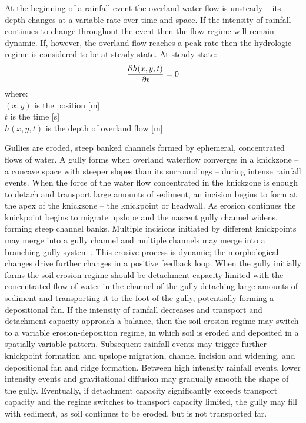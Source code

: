 \documentclass[gmd, manuscript]{copernicus}
\begin{document}
At the beginning of a rainfall event 
the overland water flow  is unsteady -- 
its depth changes at a variable rate over time and space. 
If the intensity of rainfall continues to change throughout the event
then the flow regime will remain dynamic. 
If, however, the overland flow reaches a peak rate
then the hydrologic regime is considered to be at steady state.
At steady state:
\begin{equation}
\label{eq:steady_state}
{\partial h(x,y,t) \over \partial t} = 0
\end{equation}
%
{\small
\noindent
where: \\
\noindent
\hspace*{0.5em} $(x,y)$ is the position [\unit{m}]\\
\hspace*{0.5em} $t$ is the time [\unit{s}]\\
\hspace*{0.5em} $h(x,y,t)$ is the depth of overland flow [\unit{m}]\\
}

Gullies are eroded, steep banked channels 
formed by ephemeral, concentrated flows of water.
A gully forms when overland waterflow
converges in a knickzone
-- a concave space with steeper slopes than its surroundings 
\citep{Zahra2017} -- 
during intense rainfall events.  
When the force of the water flow concentrated in the knickzone
is enough to detach and transport large amounts of sediment,
an incision begins to form at the apex of the knickzone 
-- the knickpoint or headwall.
As erosion continues the knickpoint begins to migrate upslope
and the nascent gully channel widens,
forming steep channel banks. 
Multiple incisions initiated by different knickpoints 
may merge into a gully channel
and multiple channels may merge 
into a branching gully system \citep{Mitasova2013}. 
This erosive process is dynamic; 
the morphological changes drive further changes 
in a positive feedback loop.
When the gully initially forms 
the soil erosion regime should be detachment capacity limited
with the concentrated flow of water in the channel of the gully 
detaching large amounts of sediment 
and transporting it to the foot of the gully, 
potentially forming a depositional fan.
If the intensity of rainfall decreases
and transport and detachment capacity 
approach a balance, 
then the soil erosion regime may switch to 
a variable erosion-deposition regime,
in which soil is eroded and deposited 
in a spatially variable pattern.
Subsequent rainfall events may trigger further 
knickpoint formation and upslope migration, 
channel incision and widening, and
depositional fan and ridge formation. 
Between high intensity rainfall events, 
lower intensity events and gravitational diffusion
may gradually smooth the shape of the gully. 
Eventually, if detachment capacity 
significantly exceeds transport capacity
and the regime switches to transport capacity limited, 
the gully may fill with sediment,
as soil continues to be eroded, but is not transported far. 
\end{document}
